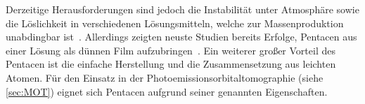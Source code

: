             Derzeitige Herausforderungen sind jedoch die Instabilität unter Atmosphäre sowie die Löslichkeit in verschiedenen Lösungsmitteln, welche zur Massenproduktion unabdingbar ist~\cite{kus_chapter_2018}.
            Allerdings zeigten neuste Studien bereits Erfolge, Pentacen aus einer Lösung als dünnen Film aufzubringen~\cite{5A_7}.
            Ein weiterer großer Vorteil des Pentacen ist die einfache Herstellung \cite{kus_chapter_2018} und die Zusammensetzung aus leichten Atomen.
            Für den Einsatz in der Photoemissionsorbitaltomographie (siehe \autoref{sec:MOT}) eignet sich Pentacen aufgrund seiner genannten Eigenschaften.
